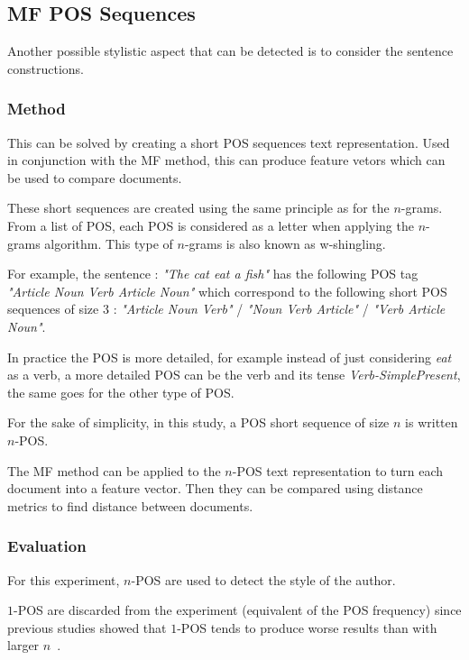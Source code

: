 \subsection{MF POS Sequences \label{sec:pos_short_sequences}}

Another possible stylistic aspect that can be detected is to consider the sentence constructions.

\subsubsection{Method}

This can be solved by creating a short POS sequences text representation.
Used in conjunction with the MF method, this can produce feature vetors which can be used to compare documents.

These short sequences are created using the same principle as for the $n$-grams.
From a list of POS, each POS is considered as a letter when applying the $n$-grams algorithm.
This type of $n$-grams is also known as w-shingling.

For example, the sentence : \textit{"The cat eat a fish"} has the following POS tag \textit{"Article Noun Verb Article Noun"} which correspond to the following short POS sequences of size 3 : \textit{"Article Noun Verb"} / \textit{"Noun Verb Article"} / \textit{"Verb Article Noun"}.

In practice the POS is more detailed, for example instead of just considering \textit{eat} as a verb, a more detailed POS can be the verb and its tense \textit{Verb-SimplePresent}, the same goes for the other type of POS.

For the sake of simplicity, in this study, a POS short sequence of size $n$ is written $n$-POS.

The MF method can be applied to the $n$-POS text representation to turn each document into a feature vector.
Then they can be compared using distance metrics to find distance between documents.

\subsubsection{Evaluation}

For this experiment, $n$-POS are used to detect the style of the author.

$1$-POS are discarded from the experiment (equivalent of the POS frequency) since previous studies showed that $1$-POS tends to produce worse results than with larger $n$~\cite{kocher_linking}.

